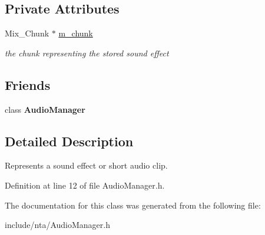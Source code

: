 \subsection*{Private Attributes}
\begin{DoxyCompactItemize}
\item 
\mbox{\label{classnta_1_1SoundEffect_a406ecb51cdbc1e757d72fae4fb35794f}} 
Mix\+\_\+\+Chunk $\ast$ \hyperlink{classnta_1_1SoundEffect_a406ecb51cdbc1e757d72fae4fb35794f}{m\+\_\+chunk}
\begin{DoxyCompactList}\small\item\em the chunk representing the stored sound effect \end{DoxyCompactList}\end{DoxyCompactItemize}
\subsection*{Friends}
\begin{DoxyCompactItemize}
\item 
\mbox{\label{classnta_1_1SoundEffect_a85edaa7e5c3ae68dabadd5373890591e}} 
class {\bfseries Audio\+Manager}
\end{DoxyCompactItemize}


\subsection{Detailed Description}
Represents a sound effect or short audio clip. 

Definition at line 12 of file Audio\+Manager.\+h.



The documentation for this class was generated from the following file\+:\begin{DoxyCompactItemize}
\item 
include/nta/Audio\+Manager.\+h\end{DoxyCompactItemize}
